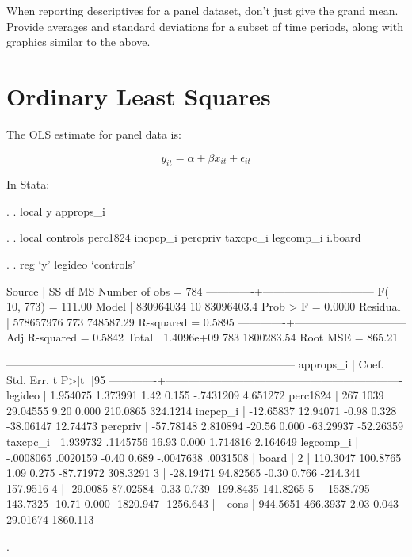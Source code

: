 \documentclass[12pt]{article}
\begin{document}
When reporting descriptives for a panel dataset, don't just give the
grand mean. Provide averages and standard deviations for a subset of
time periods, along with graphics similar to the above. 

\section{Ordinary Least Squares}

The OLS estimate for panel data is: 

\begin{equation*}
  \label{eq:ols}
  y_{it}=\alpha+ \beta x_{it} + \epsilon_{it}
\end{equation*}


In Stata:

\begin{stlog}
  . 
. local y approps_i

. 
. local controls perc1824 incpcp_i percpriv taxcpc_i  legcomp_i i.board 

. 
. reg `y'  legideo `controls'

      Source |       SS       df       MS              Number of obs =     784
-------------+------------------------------           F( 10,   773) =  111.00
       Model |   830964034    10  83096403.4           Prob > F      =  0.0000
    Residual |   578657976   773   748587.29           R-squared     =  0.5895
-------------+------------------------------           Adj R-squared =  0.5842
       Total |  1.4096e+09   783  1800283.54           Root MSE      =  865.21

------------------------------------------------------------------------------
   approps_i |      Coef.   Std. Err.      t    P>|t|     [95%
-------------+----------------------------------------------------------------
     legideo |   1.954075   1.373991     1.42   0.155    -.7431209    4.651272
    perc1824 |   267.1039   29.04555     9.20   0.000     210.0865    324.1214
    incpcp_i |  -12.65837   12.94071    -0.98   0.328    -38.06147    12.74473
    percpriv |  -57.78148   2.810894   -20.56   0.000    -63.29937   -52.26359
    taxcpc_i |   1.939732   .1145756    16.93   0.000     1.714816    2.164649
   legcomp_i |  -.0008065   .0020159    -0.40   0.689    -.0047638    .0031508
             |
       board |
          2  |   110.3047   100.8765     1.09   0.275    -87.71972    308.3291
          3  |  -28.19471   94.82565    -0.30   0.766     -214.341    157.9516
          4  |   -29.0085   87.02584    -0.33   0.739    -199.8435    141.8265
          5  |  -1538.795   143.7325   -10.71   0.000    -1820.947   -1256.643
             |
       _cons |   944.5651   466.3937     2.03   0.043     29.01674    1860.113
------------------------------------------------------------------------------

. 
\end{stlog}
\end{document}
